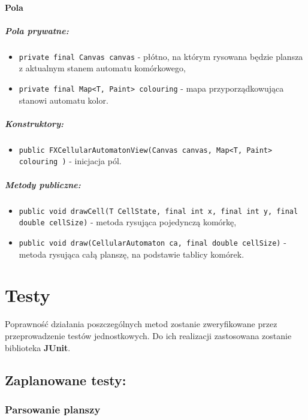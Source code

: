 \documentclass{report}
\begin{document}
\subsubsection{Pola}
\paragraph{Pola prywatne:}
\begin{itemize}
	\item \texttt{private final Canvas canvas} - płótno, na którym rysowana będzie plansza z aktualnym stanem automatu komórkowego,
	\item \texttt{private final Map<T, Paint> colouring} - mapa przyporządkowująca stanowi automatu kolor.
\end{itemize}
\paragraph{Konstruktory:}
\begin{itemize}
	\item \texttt{public FXCellularAutomatonView(Canvas canvas, Map<T, Paint> colouring )} - inicjacja pól.
\end{itemize}
\paragraph{Metody publiczne:}
\begin{itemize}
	\item \texttt{public void drawCell(T CellState, final int x, final int y, final double cellSize)} - metoda rysująca pojedynczą komórkę,
	\item \texttt{public void draw(CellularAutomaton ca, final double cellSize)} - metoda rysująca całą planszę, na podstawie tablicy komórek.
\end{itemize}



\chapter{Testy}
Poprawność działania poszczególnych metod zostanie zweryfikowane przez przeprowadzenie testów jednostkowych. Do ich realizacji zastosowana zostanie biblioteka \textbf{JUnit}.
\section{Zaplanowane testy:}
\subsection{Parsowanie planszy}
\end{document}
